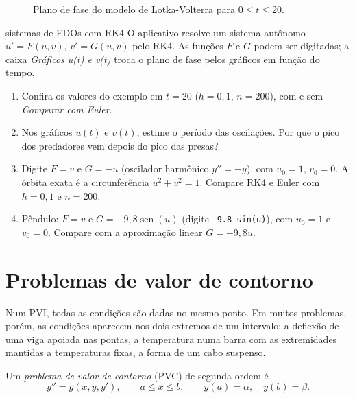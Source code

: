 \begin{figure}[h]
\caption{Plano de fase do modelo de Lotka-Volterra para $0\le t\le20$.}
\label{fig:lv}
\end{figure}

\begin{atividade}{sistemas de EDOs com RK4}{\arqSistemas}
O aplicativo resolve um sistema autônomo $u'=F(u,v)$, $v'=G(u,v)$ pelo RK4. As funções $F$ e
$G$ podem ser digitadas; a caixa \emph{Gráficos u(t) e v(t)} troca o plano de fase pelos
gráficos em função do tempo.
\begin{enumerate}[nosep]
  \item Confira os valores do exemplo em $t=20$ ($h=0{,}1$, $n=200$), com e sem \emph{Comparar
        com Euler}.
  \item Nos gráficos $u(t)$ e $v(t)$, estime o período das oscilações. Por que o pico dos
        predadores vem depois do pico das presas?
  \item Digite $F=v$ e $G=-u$ (oscilador harmônico $y''=-y$), com $u_0=1$, $v_0=0$. A órbita
        exata é a circunferência $u^2+v^2=1$. Compare RK4 e Euler com $h=0{,}1$ e $n=200$.
  \item Pêndulo: $F=v$ e $G=-9{,}8\operatorname{sen}(u)$ (digite \texttt{-9.8 sin(u)}), com
        $u_0=1$ e $v_0=0$. Compare com a aproximação linear $G=-9{,}8u$.
\end{enumerate}
\end{atividade}

\section{Problemas de valor de contorno}

Num PVI, todas as condições são dadas no mesmo ponto. Em muitos problemas, porém, as condições
aparecem nos dois extremos de um intervalo: a deflexão de uma viga apoiada nas pontas, a
temperatura numa barra com as extremidades mantidas a temperaturas fixas, a forma de um cabo
suspenso.

\begin{definicao}
Um \emph{problema de valor de contorno} (PVC) de segunda ordem é
\[
y''=g(x,y,y'),\qquad a\le x\le b,\qquad y(a)=\alpha,\quad y(b)=\beta.
\]
\end{definicao}

